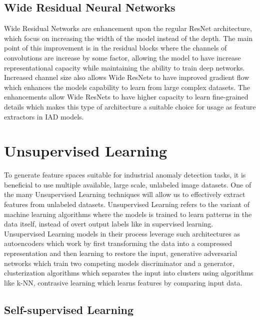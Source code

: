 \subsection{Wide Residual Neural Networks}
\label{wideresnet}

Wide Residual Networks are enhancement upon the regular ResNet architecture, which focus on increasing the width of the model instead of the depth. The main point of this improvement is in the residual blocks where the channels of convolutions are increase by some factor, allowing the model to have increase representational capacity while maintaining the ability to train deep networks. Increased channel size also allows Wide ResNets to have improved gradient flow which enhances the models capability to learn from large complex datasets. The enhancements allow Wide ResNets to have higher capacity to learn fine-grained details which makes this type of architecture a suitable choice for usage as feature extractors in IAD models.


\section{Unsupervised Learning}
\label{usupervised learning}

To generate feature spaces suitable for industrial anomaly detection tasks, it is beneficial to use multiple available, large scale, unlabeled image datasets. One of the many Unsupervised Learning techniques will allow us to effectively extract features from unlabeled datasets. Unsupervised Learning refers to the variant of machine learning algorithms where the models is trained to learn patterns in the data itself, instead of overt output labels like in supervised learning. Unsupervised Learning models in their process leverage such architectures as autoencoders which work by first transforming the data into a compressed representation and then learning to restore the input, generative adversarial networks which train two competing models discriminator and a generator, clusterization algorithms which separates the input into clusters using algorithms like k-NN, contrasive learning which learns features by comparing input data. 

\subsection{Self-supervised Learning}
\label{self-supervised learning}

